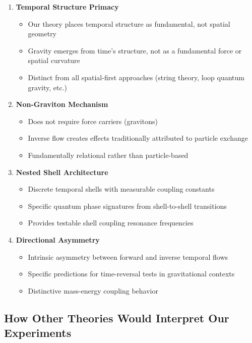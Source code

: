 \documentclass[12pt,a4paper]{article}
\begin{document}
\begin{enumerate}
    \item \textbf{Temporal Structure Primacy}
    \begin{itemize}
        \item Our theory places temporal structure as fundamental, not spatial geometry
        \item Gravity emerges from time's structure, not as a fundamental force or spatial curvature
        \item Distinct from all spatial-first approaches (string theory, loop quantum gravity, etc.)
    \end{itemize}
    
    \item \textbf{Non-Graviton Mechanism}
    \begin{itemize}
        \item Does not require force carriers (gravitons)
        \item Inverse flow creates effects traditionally attributed to particle exchange
        \item Fundamentally relational rather than particle-based
    \end{itemize}
    
    \item \textbf{Nested Shell Architecture}
    \begin{itemize}
        \item Discrete temporal shells with measurable coupling constants
        \item Specific quantum phase signatures from shell-to-shell transitions
        \item Provides testable shell coupling resonance frequencies
    \end{itemize}
    
    \item \textbf{Directional Asymmetry}
    \begin{itemize}
        \item Intrinsic asymmetry between forward and inverse temporal flows
        \item Specific predictions for time-reversal tests in gravitational contexts
        \item Distinctive mass-energy coupling behavior
    \end{itemize}
\end{enumerate}

\subsection{How Other Theories Would Interpret Our Experiments}
\end{document}
